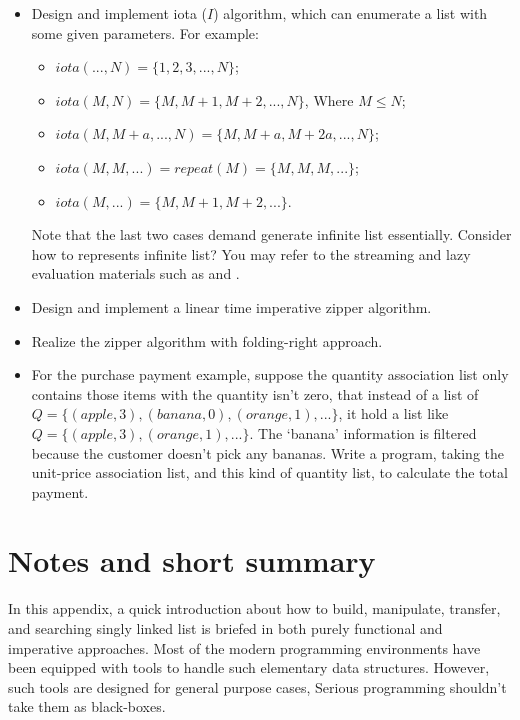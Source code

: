 \documentclass{article}
\begin{document}
\begin{Exercise}
\begin{itemize}
\item Design and implement iota ($I$) algorithm, which can enumerate a list with some given parameters. For example:
  \begin{itemize}
  \item $iota(..., N) = \{1, 2, 3, ..., N\}$;
  \item $iota(M, N) = \{M, M+1, M+2, ..., N\}$, Where $M \leq N$;
  \item $iota(M, M+a, ..., N) = \{M, M+a, M+2a, ..., N \}$;
  \item $iota(M, M, ...) = repeat(M) = \{M, M, M, ...\}$;
  \item $iota(M, ...) = \{M, M+1, M+2, ... \}$.
  \end{itemize}
  Note that the last two cases demand generate infinite list essentially. Consider how to represents infinite list?
  You may refer to the streaming and lazy evaluation materials such as \cite{SICP} and \cite{learn-haskell}.
\item Design and implement a linear time imperative zipper algorithm.
\item Realize the zipper algorithm with folding-right approach.
\item For the purchase payment example, suppose the quantity association list only contains those items with
the quantity isn't zero, that instead of a list of $Q = \{(apple, 3), (banana, 0), (orange, 1), ...\}$, it
hold a list like $Q = \{(apple, 3), (orange, 1), ...\}$. The `banana' information is filtered because the customer
doesn't pick any bananas. Write a program, taking the unit-price association list, and this kind of quantity
list, to calculate the total payment.
\end{itemize}
\end{Exercise}

\section{Notes and short summary}
In this appendix, a quick introduction about how to build, manipulate, transfer, and searching singly
linked list is briefed in both purely functional and imperative approaches. Most of the modern programming
environments have been equipped with tools to handle such elementary data structures. However, such tools
are designed for general purpose cases, Serious programming shouldn't take them as black-boxes.
\end{document}
